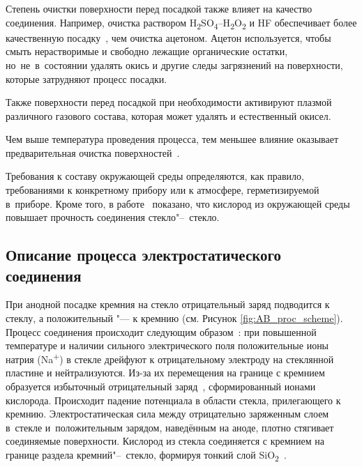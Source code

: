 Степень очистки поверхности перед посадкой также влияет на качество
соединения. Например,  очистка раствором
H\textsubscript{2}SO\textsubscript{4}–H\textsubscript{2}O\textsubscript{2}
и HF обеспечивает более качественную посадку~\cite{Lee_Detailed_characterization},
чем очистка ацетоном.
Ацетон используется, чтобы смыть нерастворимые и свободно лежащие органические остатки,
но~не~в~состоянии удалять окись и другие следы загрязнений на поверхности,
которые затрудняют процесс посадки.

Также поверхности перед посадкой при необходимости активируют плазмой~\cite{choi2002analysis} различного газового состава, которая может удалять и естественный окисел.

Чем выше температура проведения процесса, тем меньшее влияние оказывает предварительная очистка поверхностей~\cite{Cozma_Puers_1995}.

Требования к составу окружающей среды определяются, как правило, требованиями к конкретному прибору или к атмосфере, герметизируемой в~приборе. Кроме того, в работе~\cite{Cozma_Puers_1995} показано, что кислород из окружающей среды повышает прочность соединения стекло"--~стекло.

\subsection{Описание процесса электростатического соединения}
При анодной посадке кремния на стекло отрицательный заряд подводится к стеклу, а
положительный "--- к кремнию (см. Рисунок \ref{fig:AB_proc_scheme}). Процесс
соединения происходит следующим
образом~\cite{Khomenko1990physprocess, Lee_Detailed_characterization, enikov2006introduction}:
при повышенной температуре и наличии сильного электрического поля положительные
ионы натрия (Na\textsuperscript{$+$}) в стекле дрейфуют к отрицательному
электроду на стеклянной пластине и нейтрализуются. Из-за их перемещения на
границе с кремнием образуется избыточный отрицательный
заряд~\cite{rogers1995selection}, сформированный ионами кислорода. Происходит
падение потенциала в области стекла, прилегающего к кремнию. Электростатическая
сила между отрицательно заряженным слоем в~стекле и~положительным зарядом,
наведённым на аноде, плотно стягивает соединяемые поверхности. Кислород из
стекла соединяется с кремнием на границе раздела кремний"--~стекло, формируя тонкий
слой SiO\textsubscript{2}~\cite{Cozma_Puers_1995, Lee_Detailed_characterization,
Wallis_FAGS_1975}.

